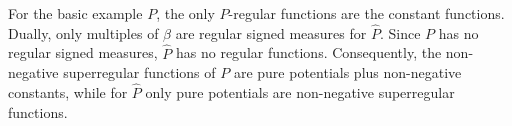 For the basic example $P$, the only $P$-regular functions are the constant functions. Dually, only multiples of $\beta$ are regular signed measures for $\hat{P}$. Since $P$ has no regular signed measures, $\hat{P}$ has no regular functions. Consequently, the non-negative superregular functions of $P$ are pure potentials plus non-negative constants, while for $\hat{P}$ only pure potentials are non-negative superregular functions.
